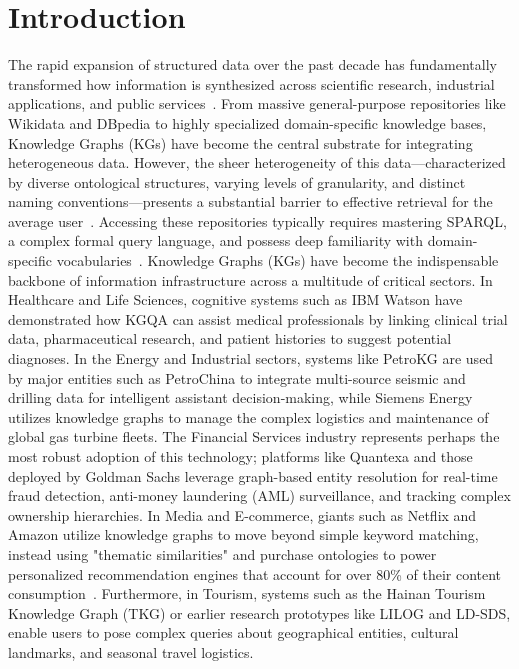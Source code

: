 \newpage
{}
\setcounter{page}{1}

\section{Introduction}

The rapid expansion of structured data over the past decade has fundamentally transformed how information is synthesized across scientific research, industrial applications, and public services~\cite{dimitrakis_survey_2020, zhang_review_2021}. From massive general-purpose repositories like Wikidata and DBpedia to highly specialized domain-specific knowledge bases, Knowledge Graphs (KGs) have become the central substrate for integrating heterogeneous data. However, the sheer heterogeneity of this data—characterized by diverse ontological structures, varying levels of granularity, and distinct naming conventions—presents a substantial barrier to effective retrieval for the average user~\cite{hoffner_survey_2017, diefenbach_core_2018}. Accessing these repositories typically requires mastering SPARQL, a complex formal query language, and possess deep familiarity with domain-specific vocabularies~\cite{pereira_systematic_2022}.
Knowledge Graphs (KGs) have become the indispensable backbone of information infrastructure across a multitude of critical sectors. In Healthcare and Life Sciences, cognitive systems such as IBM Watson have demonstrated how KGQA can assist medical professionals by linking clinical trial data, pharmaceutical research, and patient histories to suggest potential diagnoses. In the Energy and Industrial sectors, systems like PetroKG are used by major entities such as PetroChina to integrate multi-source seismic and drilling data for intelligent assistant decision-making, while Siemens Energy utilizes knowledge graphs to manage the complex logistics and maintenance of global gas turbine fleets. The Financial Services industry represents perhaps the most robust adoption of this technology; platforms like Quantexa and those deployed by Goldman Sachs leverage graph-based entity resolution for real-time fraud detection, anti-money laundering (AML) surveillance, and tracking complex ownership hierarchies. In Media and E-commerce, giants such as Netflix and Amazon utilize knowledge graphs to move beyond simple keyword matching, instead using "thematic similarities" and purchase ontologies to power personalized recommendation engines that account for over 80\% of their content consumption~\cite{antoniou_survey_2022}. Furthermore, in Tourism, systems such as the Hainan Tourism Knowledge Graph (TKG) or earlier research prototypes like LILOG and LD-SDS, enable users to pose complex queries about geographical entities, cultural landmarks, and seasonal travel logistics.
